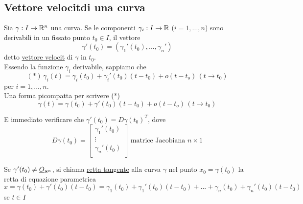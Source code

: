 \subsection{Vettore velocit\aca di una curva}
Sia $\gamma:I\to\mathbb{R}^n$ una curva. Se le componenti $\gamma_i :I \to \mathbb{R}$ ($i = 1,...,n$)
sono derivabili in un fissato punto $t_0 \in I$, il vettore
$$\gamma'(t_0) = (\gamma_1'(t_0),...,\gamma_n')$$
\ace detto \underline{vettore velocit\aca} di $\gamma$ in $t_0$.\\
Essendo la funzione $\gamma_i$ derivabile, sappiamo che 
$$(*) \, \gamma_i (t) = \gamma_i(t_0) + \gamma_i'(t_0)(t-t_0) + o(t-t_o) \, (t\to t_0)$$
per $i=1,...,n$. \\
Una forma pi\acu compatta per scrivere (*) \ace  
$$\gamma(t) = \gamma(t_0) + \gamma'(t_0)(t-t_0) + o(t-t_o) \, (t\to t_0)$$
\begin{osservazione}
  \ac{E} immediato verificare che $\gamma'(t_0) = D\gamma(t_0)^{T}$, dove 
  $$D\gamma(t_0) = \begin{bmatrix}
    \gamma_1'(t_0) \\
    \vdots \\
    \gamma_n'(t_0) \\
  \end{bmatrix} \text{ matrice Jacobiana } n\times 1$$
\end{osservazione}
\begin{definition}
  Se $\gamma'(t_0) \neq \underline{O}_{\mathbb{R}^n}$, si chiama \underline{retta tangente} alla curva $\gamma$ nel 
  punto $x_0 = \gamma(t_0)$ la retta di equazione parametrica
  $$x = \gamma(t_0)+\gamma'(t_0)(t-t_0) = \gamma_1(t_0)+\gamma_1'(t_0)(t-t_0) + ... + \gamma_n(t_0)+\gamma_n'(t_0)(t-t_0) $$
  se $t \in I$
\end{definition}
